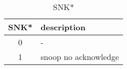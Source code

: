 %
%
\begin{table}[htbp]
\caption{SNK*}\label{tbl:snk}
   \begin{center}
   \begin{tabular}{|c|l|} \hline
      SNK* & description \\ \hline \hline
      0    & - \\ \hline
      1    & snoop no acknowledge \\ \hline
   \end{tabular}
   \end{center}
\end{table}
%
%
